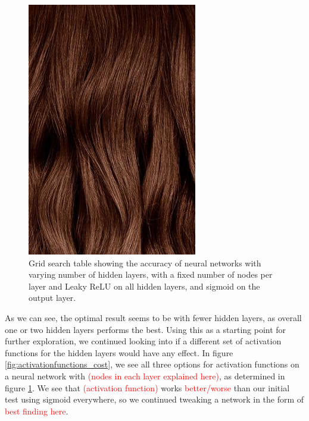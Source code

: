 
\begin{figure}
    \centering
    \includegraphics[width=\linewidth]{figures/placeholders/gridsearch_layers_nodes.png}
    \caption{Grid search table showing the accuracy of neural networks with varying number of hidden layers, with a fixed number of nodes per layer and Leaky ReLU on all hidden layers, and sigmoid on the output layer.}
    \label{fig:gridsearch_layers_nodes}
\end{figure}

As we can see, the optimal result seems to be with fewer hidden layers, as overall one or two hidden layers performs the best. Using this as a starting point for further exploration, we continued looking into if a different set of activation functions for the hidden layers would have any effect. In figure \ref{fig:activationfunctions_cost}, we see all three options for activation functions on a neural network with \textcolor{red}{(nodes in each layer explained here)}, as determined in figure \ref{fig:gridsearch_layers_nodes}. We see that \textcolor{red}{(activation function)} works \textcolor{red}{better/worse} than our initial test using sigmoid everywhere, so we continued tweaking a network in the form of \textcolor{red}{best finding here}.

